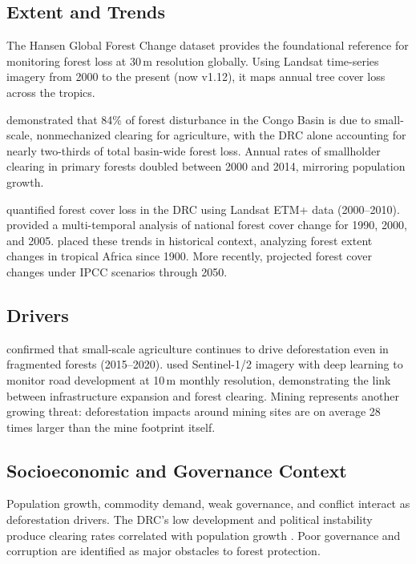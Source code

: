 \documentclass[11pt,a4paper]{article}
\begin{document}
\subsection{Extent and Trends}

The Hansen Global Forest Change dataset \citep{Hansen2013} provides the foundational reference for monitoring forest loss at 30\,m resolution globally. Using Landsat time-series imagery from 2000 to the present (now v1.12), it maps annual tree cover loss across the tropics.

\citet{Tyukavina2018} demonstrated that 84\% of forest disturbance in the Congo Basin is due to small-scale, nonmechanized clearing for agriculture, with the DRC alone accounting for nearly two-thirds of total basin-wide forest loss. Annual rates of smallholder clearing in primary forests doubled between 2000 and 2014, mirroring population growth.

\citet{Potapov2012} quantified forest cover loss in the DRC using Landsat ETM+ data (2000--2010). \citet{Ernst2013} provided a multi-temporal analysis of national forest cover change for 1990, 2000, and 2005. \citet{Aleman2018} placed these trends in historical context, analyzing forest extent changes in tropical Africa since 1900. More recently, \citet{Kafy2024} projected forest cover changes under IPCC scenarios through 2050.

\subsection{Drivers}

\citet{Shapiro2023} confirmed that small-scale agriculture continues to drive deforestation even in fragmented forests (2015--2020). \citet{Masolele2024} used Sentinel-1/2 imagery with deep learning to monitor road development at 10\,m monthly resolution, demonstrating the link between infrastructure expansion and forest clearing. Mining represents another growing threat: deforestation impacts around mining sites are on average 28 times larger than the mine footprint itself.

\subsection{Socioeconomic and Governance Context}

Population growth, commodity demand, weak governance, and conflict interact as deforestation drivers. The DRC's low development and political instability produce clearing rates correlated with population growth \citep{Tyukavina2018}. Poor governance and corruption are identified as major obstacles to forest protection.
\end{document}
